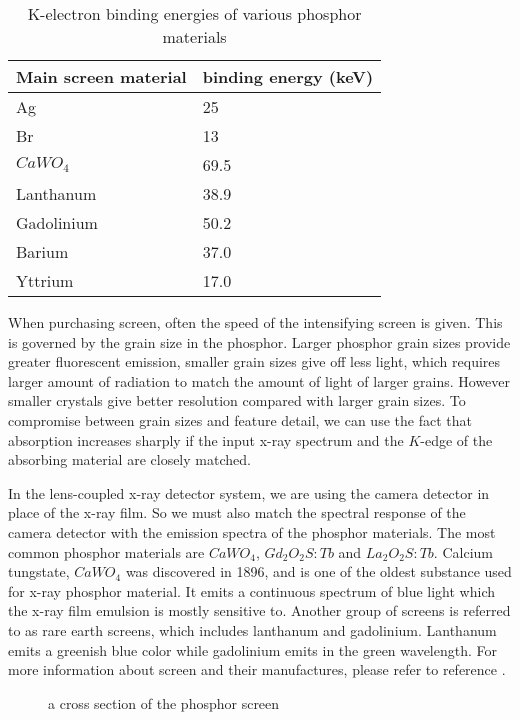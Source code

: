\begin{table}

\begin{tabular}{| l | l |}
\hline
Main screen material & binding energy (keV) \\
\hline
Ag & 25 \\
\hline
Br & 13 \\
\hline
$CaWO_4$ & 69.5 \\
\hline
Lanthanum & 38.9 \\
\hline
Gadolinium & 50.2 \\
\hline
Barium & 37.0 \\
\hline
Yttrium & 17.0 \\
\hline
\end{tabular}
\caption{K-electron binding energies of various phosphor materials}
\label{tab:binding_energy}
\end{table}

When purchasing screen, often the speed of the intensifying screen is given.  This is governed by the grain size in the phosphor.  Larger phosphor grain sizes provide greater fluorescent emission, smaller grain sizes give off less light, which requires larger amount of radiation to match the amount of light of larger grains.  However smaller crystals give better resolution compared with larger grain sizes.  To compromise between grain sizes and feature detail, we can use the fact that absorption increases sharply if the input x-ray spectrum and the $K$-edge of the absorbing material are closely matched. 

In the lens-coupled x-ray detector system, we are using the camera detector in place of the x-ray film.  So we must also match the spectral response of the camera detector with the emission spectra of the phosphor materials.  The most common phosphor materials are $CaWO_4$, $Gd_2O_2S:Tb$ and $La_2O_2S:Tb$.  Calcium tungstate, $CaWO_4$ was discovered in 1896, and is one of the oldest substance used for x-ray phosphor material.  It emits a continuous spectrum of blue light which the x-ray film emulsion is mostly sensitive to.  Another group of screens is referred to as rare earth screens, which includes lanthanum and gadolinium.  Lanthanum emits a greenish blue color while gadolinium emits in the green wavelength.  For more information about screen and their manufactures, please refer to reference \cite{barrett1981}.

\begin{figure}
\centering
\caption{a cross section of the phosphor screen}
\label{fig:phosphor_cross_secion}	
\end{figure}

